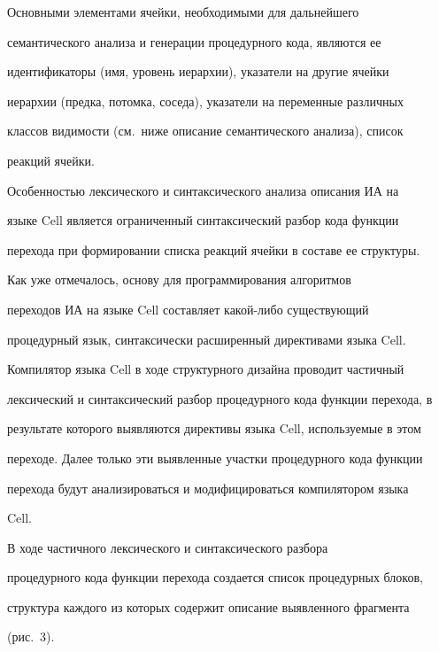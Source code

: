       


      Основными элементами ячейки, необходимыми для дальнейшего 


семантического анализа и генерации процедурного кода, являются ее 


идентификаторы (имя, уровень иерархии), указатели на другие ячейки 


иерархии (предка, потомка, соседа), указатели на переменные различных 


классов видимости (см.\ ниже описание семантического анализа), список 


реакций ячейки.


      


      Особенностью лексического и синтаксического анализа описания ИА на 


языке Cell является ограниченный синтаксический разбор кода функции 


перехода при формировании списка реакций ячейки в составе ее структуры.


      


      Как уже отмечалось, основу для программирования алгоритмов 


переходов ИА на языке Cell составляет какой-либо существующий 


процедурный язык, синтаксически расширенный директивами языка Cell. 


Компилятор языка Cell в ходе структурного дизайна проводит частичный 


лексический и синтаксический разбор процедурного кода функции перехода, в 


результате которого выявляются директивы языка Cell, используемые в этом 


переходе. Далее только эти выявленные участки процедурного кода функции 


перехода будут анализироваться и модифицироваться компилятором языка 


Cell.


      


      В ходе частичного лексического и синтаксического разбора 


процедурного кода функции перехода создается список процедурных блоков, 


структура каждого из которых содержит описание выявленного фрагмента 


(рис.~3).


